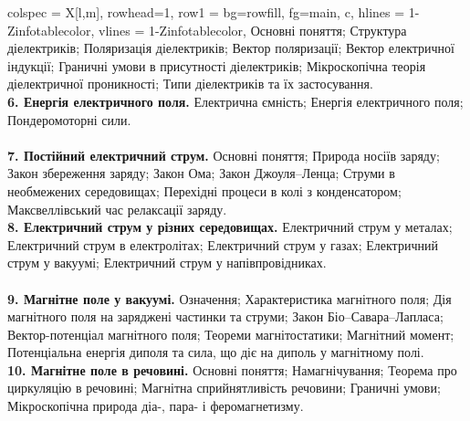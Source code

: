 \documentclass{Syllabus}
\begin{document}
\begin{longtblr}[
	]{
	colspec = {X[l,m]},
    rowhead=1,
	row{1} = {bg=rowfill, fg=main,  c},
	hlines = {1-Z}{infotablecolor},
	vlines = {1-Z}{infotablecolor},
	}
    Основні поняття; Структура діелектриків; Поляризація діелектриків; Вектор поляризації; Вектор електричної індукції; Граничні умови в присутності діелектриків; Мікроскопічна теорія діелектричної проникності; Типи діелектриків та їх застосування.
    \\
	\textbf{6. Енергія електричного поля.}\newline
    Електрична ємність; Енергія електричного поля; Пондеромоторні сили.
    \\
    \\
	\textbf{7. Постійний електричний струм.}\newline
    Основні поняття; Природа носіїв заряду; Закон збереження заряду; Закон Ома; Закон Джоуля–Ленца; Струми в необмежених середовищах; Перехідні процеси в колі з конденсатором; Максвеллівський час релаксації заряду.
    \\
	\textbf{8. Електричний струм у різних середовищах.}\newline
    Електричний струм у металах; Електричний струм в електролітах; Електричний струм у газах; Електричний струм у вакуумі; Електричний струм у напівпровідниках.
    \\
    \\
	\textbf{9. Магнітне поле у вакуумі.}\newline
    Означення; Характеристика магнітного поля; Дія магнітного поля на заряджені частинки та струми; Закон Біо–Савара–Лапласа; Вектор-потенціал магнітного поля; Теореми магнітостатики; Магнітний момент; Потенціальна енергія диполя та сила, що діє на диполь у магнітному полі.
    \\
	\textbf{10. Магнітне поле в речовині.}\newline
    Основні поняття; Намагнічування; Теорема про циркуляцію в речовині; Магнітна сприйнятливість речовини; Граничні умови; Мікроскопічна природа діа-, пара- і феромагнетизму.
    \\
    \\

\end{longtblr}
\end{document}
